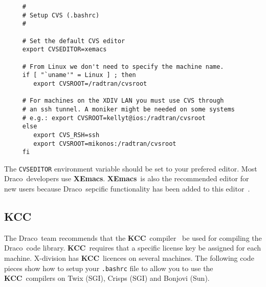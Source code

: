 \documentclass[10pt]{nmemo}
\newcommand{\comp}[1]{\normalfont\normalsize\texttt{#1}}
\newcommand{\draco}{{\normalfont\sffamily Draco}}
\newcommand{\kcc}{{\normalfont\bfseries KCC}}
\newcommand{\xemacs}{{\normalfont\bfseries XEmacs}}
\begin{document}
\footnotesize

\begin{verbatim}
     #
     # Setup CVS (.bashrc)
     #

     # Set the default CVS editor
     export CVSEDITOR=xemacs

     # From Linux we don't need to specify the machine name.
     if [ "`uname'" = Linux ] ; then
        export CVSROOT=/radtran/cvsroot

     # For machines on the XDIV LAN you must use CVS through 
     # an ssh tunnel. A moniker might be needed on some systems
     # e.g.: export CVSROOT=kellyt@ios:/radtran/cvsroot
     else
        export CVS_RSH=ssh
        export CVSROOT=mikonos:/radtran/cvsroot
     fi
\end{verbatim}

\normalsize

The \comp{CVSEDITOR} environment variable should be set to your
prefered editor.  Most \draco\ developers use \xemacs.   \xemacs\ is
also the recommended editor for new users because \draco\ sepcific
functionality has been added to this editor~\cite{xtm:9909}.

\subsection{KCC}

The \draco\ team recommends that the \kcc\ compiler~\cite{kai} be used
for compiling the \draco\ code library.  \kcc\ requires that a
specific license key be assigned for each machine.  X-division has
\kcc\ licences on several machines.  The following code pieces show
how to setup your \comp{.bashrc} file to allow you to use the \kcc\ 
compilers on Twix (SGI), Crisps (SGI) and Bonjovi (Sun).

\footnotesize
\end{document}
